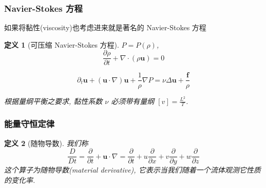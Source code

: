 \documentclass[aspectratio=2516]{beamer}
\newtheorem{defi}{\kaishu 定义}
\begin{document}

\begin{frame}
\frametitle{\kaishu Navier-Stokes 方程}

\kaishu 

如果将黏性(viscosity)也考虑进来就是著名的 Navier-Stokes 方程

\vspace{0.75cm}

\begin{defi}[\kaishu 可压缩 Navier-Stokes 方程]
	
	\kaishu 
	
	$ P = P(\rho) $,
	\begin{equation}
	\frac{{\partial \rho }}{{\partial t}} + \nabla  \cdot \left( {\rho \boldsymbol{u}} \right) = 0
	\label{eq5.1.18}
	\end{equation}
	
	\vspace{0.25cm}
	
	\begin{equation}
	{\partial _t}\boldsymbol{u} + \left( {\boldsymbol{u} \cdot \nabla } \right)\boldsymbol{u} + \frac{1}{\rho }\nabla P = \nu \Delta \boldsymbol{u} + \frac{\boldsymbol{f}}{\rho }
	\label{eq5.1.19}
	\end{equation}
	
	\vspace{0.25cm}
	
	根据量纲平衡之要求, 黏性系数 $ \nu  $ 必须带有量纲 $\left[ v \right] = \frac{{{L^2}}}{T}$. 
\end{defi}

\end{frame}


\begin{frame}
\frametitle{\kaishu 能量守恒定律}

\kaishu 

\begin{defi}[\kaishu 随物导数]
	
	\kaishu 
	
	我们称
	\begin{equation}
	\frac{D}{{Dt}} = \frac{\partial }{{\partial t}} + \boldsymbol{u} \cdot \nabla  = \frac{\partial }{{\partial t}} + u\frac{\partial }{{\partial x}} + v\frac{\partial }{{\partial y}} + w\frac{\partial }{{\partial z}}
	\label{eq5.1.20}
	\end{equation}
	这个算子为随物导数(material derivative), 它表示当我们随着一个流体观测它性质的变化率.
\end{defi}

\end{frame}
\end{document}
